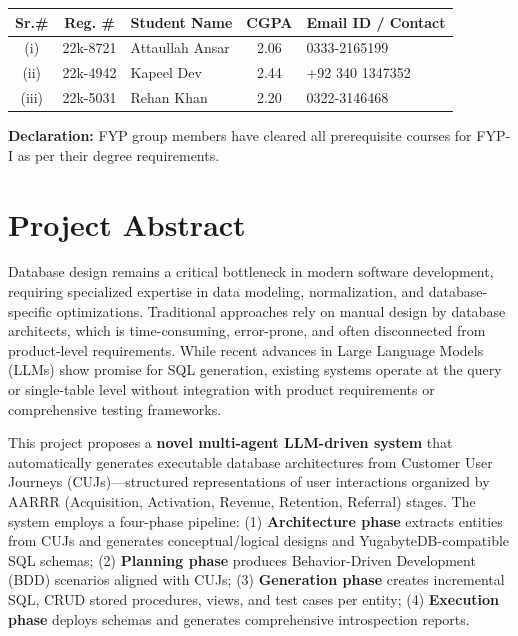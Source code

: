\documentclass[12pt,a4paper]{article}
\begin{document}
\vspace{0.5cm}

\begin{tabular}{|c|c|p{3.5cm}|c|p{3.5cm}|}
\hline
\textbf{Sr.\#} & \textbf{Reg. \#} & \textbf{Student Name} & \textbf{CGPA} & \textbf{Email ID / Contact} \\
\hline
(i) & 22k-8721 & Attaullah Ansar & 2.06 & 0333-2165199 \\[0.8cm]
\hline
(ii) & 22k-4942 & Kapeel Dev & 2.44 & +92 340 1347352 \\[0.8cm]
\hline
(iii) & 22k-5031 & Rehan Khan & 2.20 & 0322-3146468 \\[0.8cm]
\hline
\end{tabular}


\vspace{0.5cm}

\textbf{Declaration:} FYP group members have cleared all prerequisite courses for FYP-I as per their degree requirements.

\newpage

\section*{Project Abstract}

Database design remains a critical bottleneck in modern software development, requiring specialized expertise in data modeling, normalization, and database-specific optimizations. Traditional approaches rely on manual design by database architects, which is time-consuming, error-prone, and often disconnected from product-level requirements. While recent advances in Large Language Models (LLMs) show promise for SQL generation, existing systems operate at the query or single-table level without integration with product requirements or comprehensive testing frameworks.

This project proposes a \textbf{novel multi-agent LLM-driven system} that automatically generates executable database architectures from Customer User Journeys (CUJs)—structured representations of user interactions organized by AARRR (Acquisition, Activation, Revenue, Retention, Referral) stages. The system employs a four-phase pipeline: (1) \textbf{Architecture phase} extracts entities from CUJs and generates conceptual/logical designs and YugabyteDB-compatible SQL schemas; (2) \textbf{Planning phase} produces Behavior-Driven Development (BDD) scenarios aligned with CUJs; (3) \textbf{Generation phase} creates incremental SQL, CRUD stored procedures, views, and test cases per entity; (4) \textbf{Execution phase} deploys schemas and generates comprehensive introspection reports.
\end{document}

